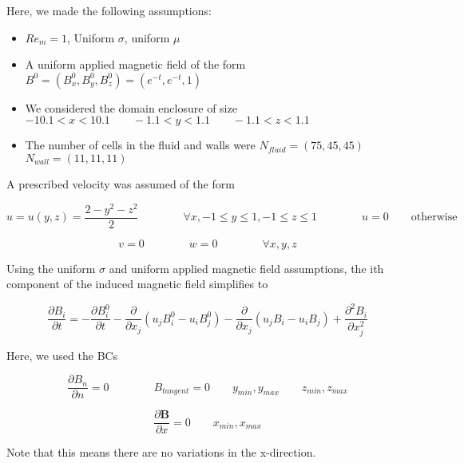 \documentclass[11pt]{article}
\begin{document}
Here, we made the following assumptions:

\begin{itemize}
\item $Re_m = 1$, Uniform $\sigma$, uniform $\mu$
\item A uniform applied magnetic field of the form $B^0 = (B_x^0,B_y^0,B_z^0) = (e^{-t},e^{-t},1)$
\item We considered the domain enclosure of size $-10.1 < x < 10.1 \qquad -1.1 < y < 1.1 \qquad -1.1 < z < 1.1$
\item The number of cells in the fluid and walls were $N_{fluid} = (75,45,45)$ \qquad $N_{wall} = (11,11,11)$
\end{itemize}

A prescribed velocity was assumed of the form

\begin{equation}
	u
	=
	u(y,z)
	= \frac{2 - y^2 - z^2}{2}
	\qquad \qquad
	\forall x
	,
	-1 \le y \le 1
	,
	-1 \le z \le 1
	\qquad \qquad
	u = 0 
	\qquad
	\text{otherwise}
\end{equation}

\begin{equation}
	v = 0
	\qquad \qquad
	w = 0
	\qquad \qquad
	\forall x,y,z
\end{equation}


Using the uniform $\sigma$ and uniform applied magnetic field assumptions, the ith component of the induced magnetic field simplifies to

\begin{equation}
	\frac{\partial B_i}{\partial t} 
	=
	-
	\frac{\partial B_i^0}{\partial t}
	-
	\frac{\partial}{\partial x_j} (u_j B_i^0 - u_i B_j^0) 
	-
	\frac{\partial}{\partial x_j} (u_j B_i - u_i B_j) 
	+
	\frac{\partial^2 B_i}{\partial x_j^2} 
\end{equation}

Here, we used the BCs

\begin{equation}
	\frac{\partial B_{n}}{\partial n} = 0
	\qquad \qquad
	B_{tangent} = 0
	\qquad
	y_{min}, y_{max}
	\qquad
	z_{min}, z_{max}
\end{equation}

\begin{equation}
	\frac{\partial \pmb{B}}{\partial x} = 0
	\qquad
	x_{min}, x_{max}
\end{equation}

Note that this means there are no variations in the x-direction. 
\end{document}
